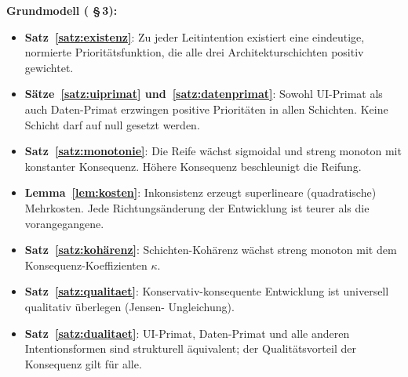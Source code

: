 ﻿\documentclass[a4paper,12pt]{article}
\theoremstyle{definition}
\begin{document}
\textbf{Grundmodell ( §\,3):}
\begin{itemize}
    \item \textbf{Satz~\ref{satz:existenz}}: Zu jeder Leitintention
          existiert eine eindeutige, normierte Prioritätsfunktion, die
          alle drei Architekturschichten positiv gewichtet.
    \item \textbf{Sätze~\ref{satz:uiprimat} und~\ref{satz:datenprimat}}:
          Sowohl UI-Primat als auch Daten-Primat erzwingen positive
          Prioritäten in allen Schichten. Keine Schicht darf auf null
          gesetzt werden.
    \item \textbf{Satz~\ref{satz:monotonie}}: Die Reife wächst sigmoidal
          und streng monoton mit konstanter Konsequenz. Höhere Konsequenz
          beschleunigt die Reifung.
    \item \textbf{Lemma~\ref{lem:kosten}}: Inkonsistenz erzeugt
          superlineare (quadratische) Mehrkosten. Jede Richtungsänderung
          der Entwicklung ist teurer als die vorangegangene.
    \item \textbf{Satz~\ref{satz:kohärenz}}: Schichten-Kohärenz wächst
          streng monoton mit dem Konsequenz-Koeffizienten $\kappa$.
    \item \textbf{Satz~\ref{satz:qualitaet}}: Konservativ-konsequente
          Entwicklung ist universell qualitativ überlegen (Jensen-
          Ungleichung).
    \item \textbf{Satz~\ref{satz:dualitaet}}: UI-Primat, Daten-Primat
          und alle anderen Intentionsformen sind strukturell äquivalent;
          der Qualitätsvorteil der Konsequenz gilt für alle.
\end{itemize}
\end{document}
